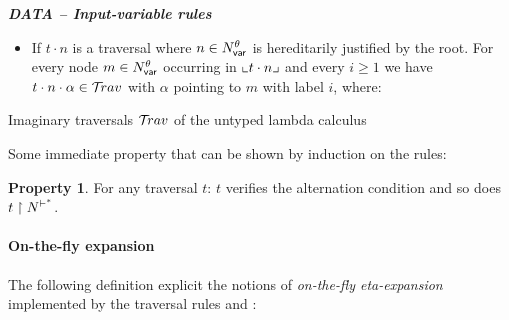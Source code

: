 \documentclass{article}
\theoremstyle{definition}
\newtheorem{property}{Property}[section]
\newcommand\Nodes{N}%
\newcommand\NodesVar{N_{\sf var}}%
\newcommand{\ghostlmd}{{\lambda\!\!\lambda}}
\newcommand{\ghostvar}{\theta}
\newcommand{\travulc}{\travset}
\newcommand{\enables}{\vdash} %
\newcommand{\NodeHjByRoot}{\Nodes^{\enables^*}} %
\begin{document}
\begin{FramedTable}
\emph{\bf DATA -- Input-variable rules}
\begin{itemize}
\item {} If $t \cdot n$ is a traversal where $n \in \NodesVar^\ghostvar$ is hereditarily justified by the root. For every node $m \in \NodesVar^\ghostvar$ occurring in $\llcorner t\cdot n \lrcorner$
and every $i\geq1$ we have $t \cdot n \cdot \alpha \in \travulc$ with $\alpha$ pointing to $m$ with label $i$, where:
\end{itemize}


\caption{Imaginary traversals $\travulc$ of the untyped lambda calculus}
 \label{tab:trav_rules}
\end{FramedTable}

Some immediate property that can be shown by induction on the rules:
\begin{property}
   For any traversal $t$: $t$ verifies the alternation condition and so does $t\filter\NodeHjByRoot$.
\end{property}
\paragraph{On-the-fly expansion}
The following definition explicit the notions of \emph{on-the-fly eta-expansion} implemented by the
traversal rules  and :
\end{document}

